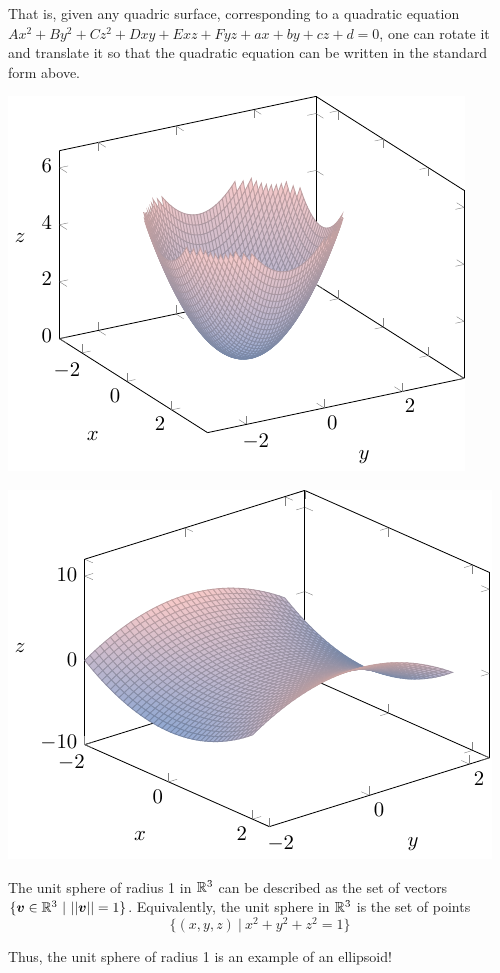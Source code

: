 That is, given any quadric surface, corresponding to a quadratic equation $Ax^2 + By^2 + Cz^2 + Dxy + Exz + Fyz + ax + by + cz + d = 0$, one can rotate it and translate it so that the quadratic equation can be written in the standard form above.

\begin{center}
    \includegraphics{chapters/2-RealAnalysis/figures/figures-ellipticparaboloid.pdf}
\end{center}

\begin{center}
    \includegraphics{chapters/2-RealAnalysis/figures/figures-hyperbolicparaboloid.pdf}
\end{center}

\begin{example}
The unit sphere of radius 1 in $\mathbb{R}^3$ can be described as the set of vectors $\{\bm{v} \in \mathbb{R}^3 \ | \ ||\bm{v}|| = 1\}$.  Equivalently, the unit sphere in $\mathbb{R}^3$ is the set of points $$\{ (x, y, z) \ | \ x^2 + y^2 + z^2 =1\}$$

Thus, the unit sphere of radius 1 is an example of an ellipsoid!
\end{example}

